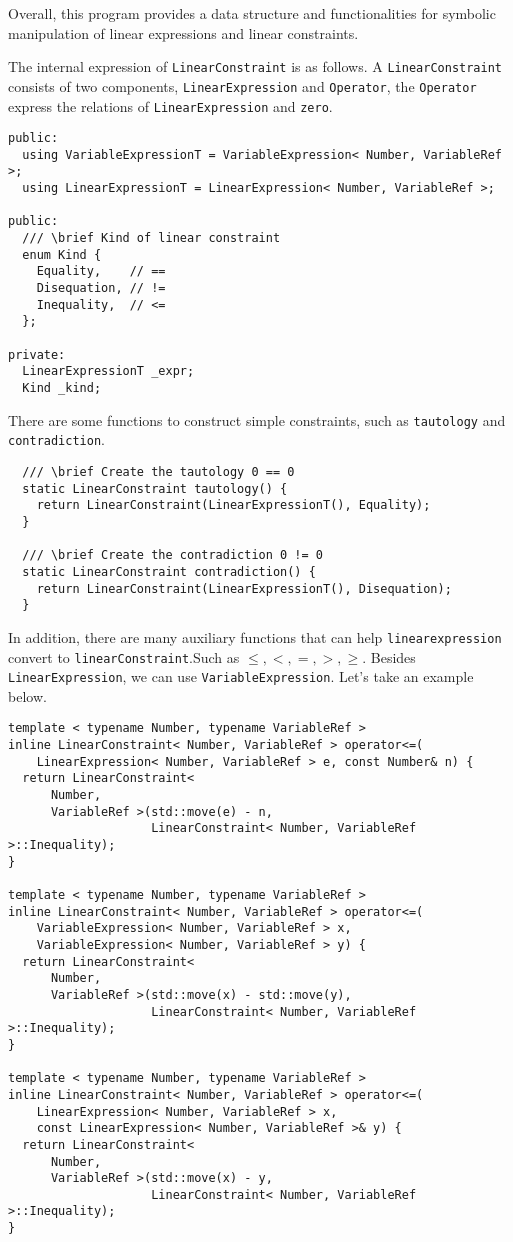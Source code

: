 \documentclass[12pt]{article}
\begin{document}
Overall, this program provides a data structure and functionalities for symbolic manipulation of linear expressions and linear constraints.

The internal expression of \texttt{LinearConstraint} is as follows. A \texttt{LinearConstraint} consists of two components, \texttt{LinearExpression} and \texttt{Operator}, the \texttt{Operator} express the relations of \texttt{LinearExpression} and \texttt{zero}.
\begin{lstlisting}
public:
  using VariableExpressionT = VariableExpression< Number, VariableRef >;
  using LinearExpressionT = LinearExpression< Number, VariableRef >;

public:
  /// \brief Kind of linear constraint
  enum Kind {
    Equality,    // ==
    Disequation, // !=
    Inequality,  // <=
  };

private:
  LinearExpressionT _expr;
  Kind _kind;
\end{lstlisting}

There are some functions to construct simple constraints, such as \texttt{tautology} and \texttt{contradiction}.
\begin{lstlisting}
  /// \brief Create the tautology 0 == 0
  static LinearConstraint tautology() {
    return LinearConstraint(LinearExpressionT(), Equality);
  }

  /// \brief Create the contradiction 0 != 0
  static LinearConstraint contradiction() {
    return LinearConstraint(LinearExpressionT(), Disequation);
  }
\end{lstlisting}

In addition, there are many auxiliary functions that can help \texttt {linearexpression} convert to \texttt {linearConstraint}.Such as $\leq, <, =,>, \geq$. Besides \texttt{LinearExpression}, we can use \texttt{VariableExpression}. Let's take an example below.

\begin{lstlisting}
template < typename Number, typename VariableRef >
inline LinearConstraint< Number, VariableRef > operator<=(
    LinearExpression< Number, VariableRef > e, const Number& n) {
  return LinearConstraint<
      Number,
      VariableRef >(std::move(e) - n,
                    LinearConstraint< Number, VariableRef >::Inequality);
}

template < typename Number, typename VariableRef >
inline LinearConstraint< Number, VariableRef > operator<=(
    VariableExpression< Number, VariableRef > x,
    VariableExpression< Number, VariableRef > y) {
  return LinearConstraint<
      Number,
      VariableRef >(std::move(x) - std::move(y),
                    LinearConstraint< Number, VariableRef >::Inequality);
}

template < typename Number, typename VariableRef >
inline LinearConstraint< Number, VariableRef > operator<=(
    LinearExpression< Number, VariableRef > x,
    const LinearExpression< Number, VariableRef >& y) {
  return LinearConstraint<
      Number,
      VariableRef >(std::move(x) - y,
                    LinearConstraint< Number, VariableRef >::Inequality);
}
\end{lstlisting}
\end{document}
